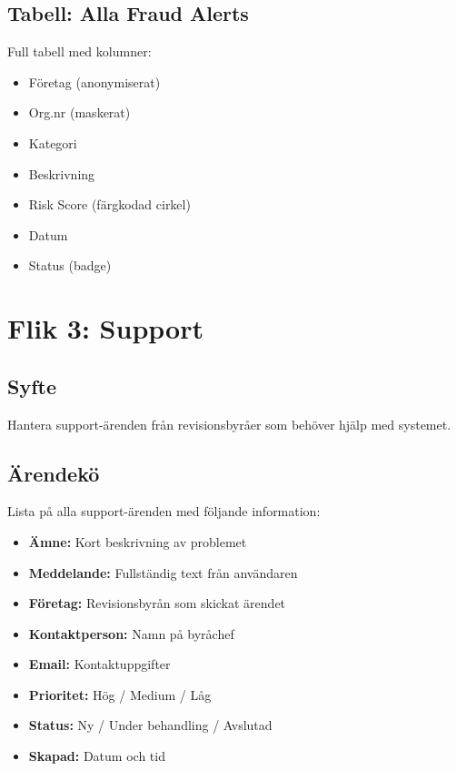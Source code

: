 \documentclass[12pt,a4paper]{article}
\begin{document}
\subsection{Tabell: Alla Fraud Alerts}
Full tabell med kolumner:
\begin{itemize}
  \item Företag (anonymiserat)
  \item Org.nr (maskerat)
  \item Kategori
  \item Beskrivning
  \item Risk Score (färgkodad cirkel)
  \item Datum
  \item Status (badge)
\end{itemize}

\section{Flik 3: Support}

\subsection{Syfte}
Hantera support-ärenden från revisionsbyråer som behöver hjälp med systemet.

\subsection{Ärendekö}
Lista på alla support-ärenden med följande information:

\begin{itemize}
  \item \textbf{Ämne:} Kort beskrivning av problemet
  \item \textbf{Meddelande:} Fullständig text från användaren
  \item \textbf{Företag:} Revisionsbyrån som skickat ärendet
  \item \textbf{Kontaktperson:} Namn på byråchef
  \item \textbf{Email:} Kontaktuppgifter
  \item \textbf{Prioritet:} Hög / Medium / Låg
  \item \textbf{Status:} Ny / Under behandling / Avslutad
  \item \textbf{Skapad:} Datum och tid
\end{itemize}
\end{document}
